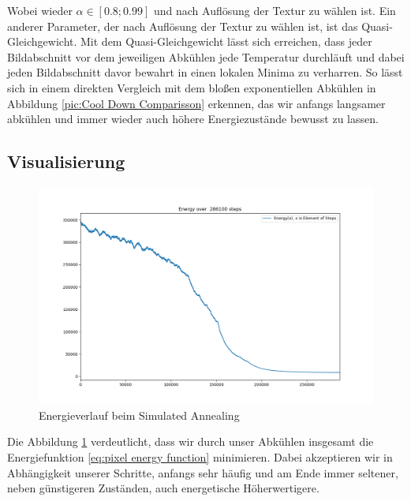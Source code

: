 Wobei wieder $\alpha \in [0.8; 0.99]$ und nach Auflösung der Textur zu wählen ist. Ein anderer Parameter, der nach 
Auflösung der Textur zu wählen ist, ist das Quasi-Gleichgewicht. Mit dem Quasi-Gleichgewicht lässt sich erreichen, 
dass jeder Bildabschnitt vor dem jeweiligen Abkühlen jede Temperatur durchläuft und dabei jeden Bildabschnitt davor 
bewahrt in einen lokalen Minima zu verharren.
So lässt sich in einem direkten Vergleich mit dem bloßen exponentiellen Abkühlen in Abbildung 
\ref{pic:Cool Down Comparisson} erkennen, das wir anfangs langsamer abkühlen und immer wieder auch 
höhere Energiezustände bewusst zu lassen.

\subsection{Visualisierung}

\begin{figure}[H]
    \centering
    \includegraphics[width=\linewidth]{content/simulatedAnnealing/Bilder/Energy_286100_steps_KirkpatrickCooldownSchedule.png}
    \caption{Energieverlauf beim Simulated Annealing}
    \label{pic:kirkpatrick energie verlauf}
\end{figure}

Die Abbildung \ref{pic:kirkpatrick energie verlauf} verdeutlicht, dass wir durch unser Abkühlen insgesamt die 
Energiefunktion \ref{eq:pixel energy function} minimieren. Dabei akzeptieren wir in Abhängigkeit unserer Schritte,
anfangs sehr häufig und am Ende immer seltener, neben günstigeren Zuständen, auch energetische Höherwertigere.

